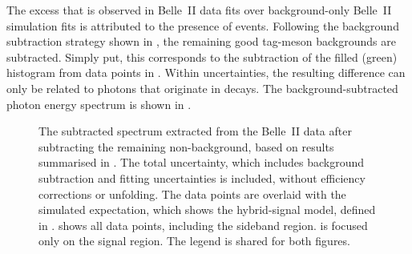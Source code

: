 The excess that is observed in Belle~II data fits over background-only Belle~II simulation fits is attributed to the presence of \BtoXsdgamma events.
Following the background subtraction strategy shown in ,
the remaining good tag-\B meson backgrounds are subtracted.
Simply put, this corresponds to the subtraction of the filled (green) histogram from data points in .
Within uncertainties, the resulting difference can only be related to photons that originate in \BtoXsdgamma decays.
The background-subtracted photon energy spectrum is shown in .
\begin{figure}[htbp]
    \caption{\label{fig:subtracted_results}
        The subtracted spectrum extracted from the Belle~II data after subtracting the remaining non-\BtoXsdgamma background,
        based on results summarised in .
        The total uncertainty, which includes background subtraction and fitting uncertainties is included, without efficiency corrections or unfolding.
        The data points are overlaid with the simulated expectation, which shows the hybrid-signal model, defined in .
         shows all data points, including the sideband region.
         is focused only on the signal region.
        The legend is shared for both figures.
    }
\end{figure}

